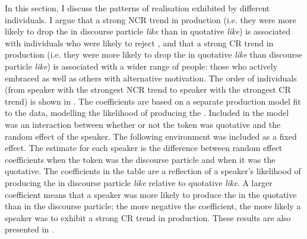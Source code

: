 In this section, I discuss the patterns of  realisation exhibited by different individuals. I argue that a strong NCR trend in production (i.e. they were more likely to drop the  in discourse particle \textit{like} than in quotative \textit{like}) is associated with individuals who were likely to reject , and that a strong CR trend in production (i.e. they were more likely to drop the  in quotative \textit{like} than discourse particle \textit{like}) is associated with a wider range of people: those who actively embraced  as well as others with alternative motivation. The order of individuals (from speaker with the strongest NCR trend to speaker with the strongest CR trend) is shown in . The coefficients are based on a separate production model fit to the data, modelling the likelihood of producing the . Included in the model was an interaction between whether or not the token was quotative and the random effect of the speaker. The following environment was included as a fixed effect. The estimate for each speaker is the difference between random effect coefficients when the token was the discourse particle and when it was the quotative. The coefficients in the table are a reflection of a speaker's likelihood of producing the  in discourse particle \textit{like} relative to quotative \textit{like}. A larger coefficient means that a speaker was more likely to produce the  in the quotative than in the discourse particle; the more negative the coefficient, the more likely a speaker was to exhibit a strong CR trend in production. These results are also presented in \citet{dragerhay2012}.

